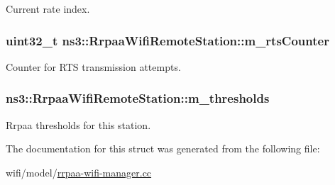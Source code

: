 Current rate index. 

\subsubsection[{\texorpdfstring{m\+\_\+rts\+Counter}{m_rtsCounter}}]{\setlength{\rightskip}{0pt plus 5cm}uint32\+\_\+t ns3\+::\+Rrpaa\+Wifi\+Remote\+Station\+::m\+\_\+rts\+Counter}\hypertarget{structns3_1_1RrpaaWifiRemoteStation_a065e37b45777c7d651e4836fa172dcdb}{}\label{structns3_1_1RrpaaWifiRemoteStation_a065e37b45777c7d651e4836fa172dcdb}


Counter for R\+TS transmission attempts. 

\subsubsection[{\texorpdfstring{m\+\_\+thresholds}{m_thresholds}}]{ ns3\+::\+Rrpaa\+Wifi\+Remote\+Station\+::m\+\_\+thresholds}\hypertarget{structns3_1_1RrpaaWifiRemoteStation_a7a00d06363375d104c1aff7ee1218b2a}{}\label{structns3_1_1RrpaaWifiRemoteStation_a7a00d06363375d104c1aff7ee1218b2a}


Rrpaa thresholds for this station. 



The documentation for this struct was generated from the following file\+:\begin{DoxyCompactItemize}
\item 
wifi/model/\hyperlink{rrpaa-wifi-manager_8cc}{rrpaa-\/wifi-\/manager.\+cc}\end{DoxyCompactItemize}
